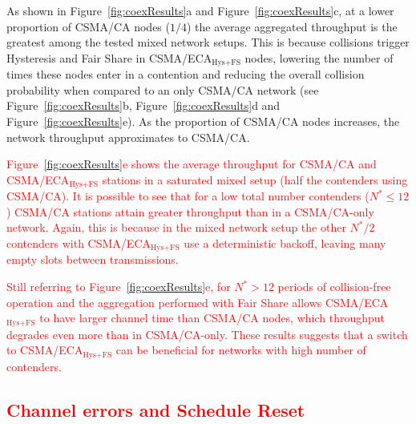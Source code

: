 	As shown in Figure~\ref{fig:coexResults}a and Figure~\ref{fig:coexResults}c, at a lower proportion of CSMA/CA nodes ($1/4$) the average aggregated throughput is the greatest among the tested mixed network setups. This is because collisions trigger Hysteresis and Fair Share in CSMA/ECA$_{\text{Hys+FS}}$ nodes, lowering the number of times these nodes enter in a contention and reducing the overall collision probability when compared to an only CSMA/CA network (see Figure~\ref{fig:coexResults}b, Figure~\ref{fig:coexResults}d and Figure~\ref{fig:coexResults}e). As the proportion of CSMA/CA nodes increases, the network throughput approximates to CSMA/CA.
	
	\textcolor{red}{Figure~\ref{fig:coexResults}e shows the average throughput for CSMA/CA and CSMA/ECA$_{\text{Hys+FS}}$ stations in a saturated mixed setup (half the contenders using CSMA/CA). It is possible to see that for a low total number contenders ($N^{*}\leq 12$) CSMA/CA stations attain greater throughput than in a CSMA/CA-only network. Again, this is because in the mixed network setup the other $N^{*}/2$ contenders with CSMA/ECA$_{\text{Hys+FS}}$ use a deterministic backoff, leaving many empty slots between transmissions.} 
	
	\textcolor{red}{Still referring to Figure~\ref{fig:coexResults}e, for $N^{*}>12$ periods of collision-free operation and the aggregation performed with Fair Share allows CSMA/ECA$_{\text{Hys+FS}}$ to have larger channel time than CSMA/CA nodes, which throughput degrades even more than in CSMA/CA-only. These results suggests that a switch to CSMA/ECA$_{\text{Hys+FS}}$ can be beneficial for networks with high number of contenders.}
	
	
	
	\textcolor{red}{\subsection{Channel errors and Schedule Reset}\label{resultsSchedRest}}
	
